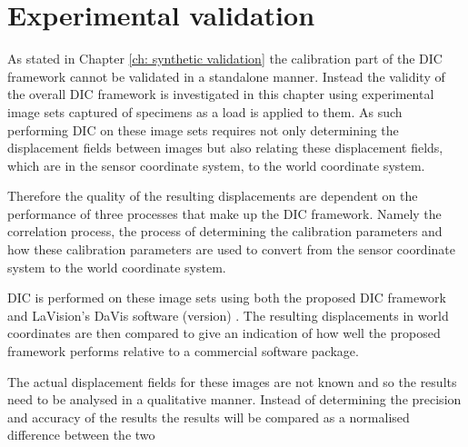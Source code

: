 \documentclass[12pt,oneside,openany,a4paper, %
english, %
masters-t, goldenblock]{usthesis}
\begin{document}




\chapter{Experimental validation}
\label{ch: experimental validation}
As stated in Chapter \ref{ch: synthetic validation} the calibration part of the DIC framework cannot be validated in a standalone manner. Instead the validity of the overall DIC framework is investigated in this chapter using experimental image sets captured of specimens as a load is applied to them. As such performing DIC on these image sets requires not only determining the displacement fields between images but also relating these displacement fields, which are in the sensor coordinate system, to the world coordinate system. 

Therefore the quality of the resulting displacements are dependent on the performance of three processes that make up the DIC framework. Namely the correlation process, the process of determining the calibration parameters and how these calibration parameters are used to convert from the sensor coordinate system to the world coordinate system. 

DIC is performed on these image sets using both the proposed DIC framework and LaVision's DaVis software (version) . The resulting displacements in world coordinates are then compared to give an indication of how well the proposed framework performs relative to a commercial software package.

The actual displacement fields for these images are not known and so the results need to be analysed in a qualitative manner. Instead of determining the precision and accuracy of the results the results will be compared as a normalised difference between the two
\end{document}
